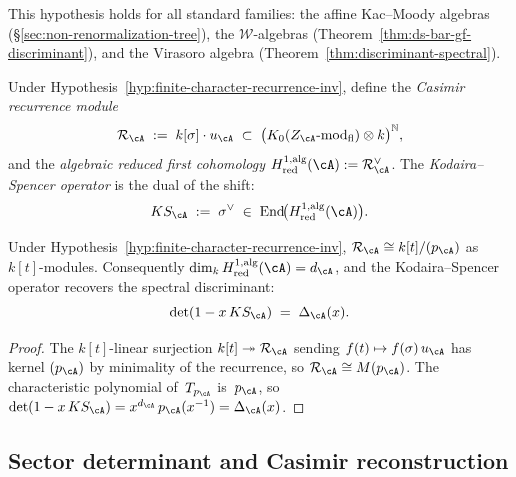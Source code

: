 \noindent
This hypothesis holds for all standard families: the
affine Kac--Moody algebras
(\S\ref{sec:non-renormalization-tree}),
the $\mathcal{W}$-algebras
(Theorem~\ref{thm:ds-bar-gf-discriminant}),
and the Virasoro algebra
(Theorem~\ref{thm:discriminant-spectral}).

\begin{definition}
\label{def:casimir-recurrence-module}
Under Hypothesis~\ref{hyp:finite-character-recurrence-inv},
define the \emph{Casimir recurrence module}
\[
\mathcal{R}_\cA
 \;:=\;
 k[\sigma]\cdot u_\cA
 \;\subset\;
 \bigl(K_0(Z_\cA\text{-mod}_{\mathrm{fl}})
 \otimes k\bigr)^{\mathbb{N}},
\]
and the \emph{algebraic reduced first cohomology}
$H^{1,\mathrm{alg}}_{\mathrm{red}}(\cA)
 := \mathcal{R}_\cA^\vee$.
The \emph{Kodaira--Spencer operator} is the dual of the
shift:
\[
KS_\cA \;:=\; \sigma^\vee
 \;\in\;
 \operatorname{End}\!\bigl(
 H^{1,\mathrm{alg}}_{\mathrm{red}}(\cA)
 \bigr).
\]
\end{definition}

\begin{theorem}
\label{thm:minimal-intrinsic-realization-inv}
Under Hypothesis~\ref{hyp:finite-character-recurrence-inv},
$\mathcal{R}_\cA \cong k[t]/(p_\cA)$ as $k[t]$-modules.
Consequently
$\dim_k H^{1,\mathrm{alg}}_{\mathrm{red}}(\cA)
 = d_\cA$,
and the Kodaira--Spencer operator recovers the spectral
discriminant:
\begin{equation}\label{eq:ks-recovers-discriminant}
\det(1 - x\,KS_\cA)
 \;=\;
 \Delta_\cA(x).
\end{equation}
\end{theorem}

\begin{proof}
The $k[t]$-linear surjection
$k[t] \twoheadrightarrow \mathcal{R}_\cA$ sending
$f(t) \mapsto f(\sigma)\,u_\cA$ has kernel $(p_\cA)$ by
minimality of the recurrence, so
$\mathcal{R}_\cA \cong M(p_\cA)$. The characteristic
polynomial of~$T_{p_\cA}$ is~$p_\cA$, so
$\det(1-x\,KS_\cA)
 = x^{d_\cA}\,p_\cA(x^{-1})
 = \Delta_\cA(x)$.
\end{proof}

\subsection{Sector determinant and Casimir reconstruction}
\label{subsec:sector-determinant}

